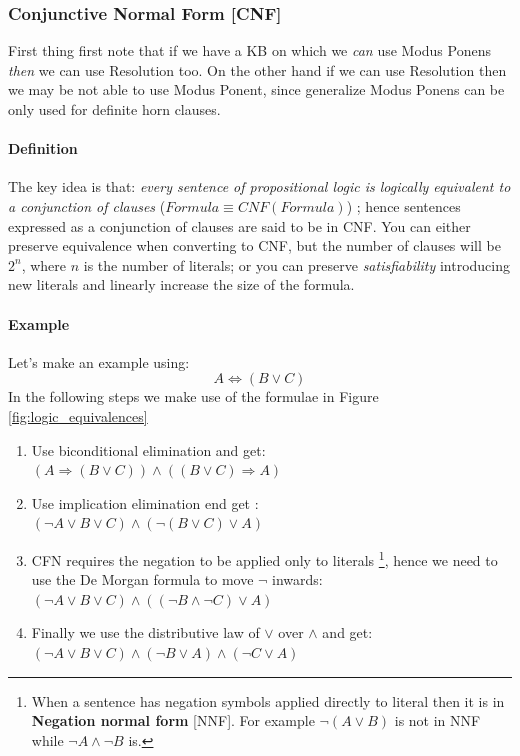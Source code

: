 \documentclass[10pt,a4paper]{article}
\begin{document}
\subsubsection{Conjunctive Normal Form [CNF]}
\label{subsec:cnf}

First thing first note that if we have a KB on which we \textit{can} use Modus Ponens \textit{then} we can use Resolution too. On the other hand if we can use Resolution then we may be not able to use Modus Ponent, since generalize Modus Ponens can be only used for definite horn clauses.



\paragraph{Definition}
The key idea is that: \textit{every sentence of propositional logic is logically equivalent to a conjunction of clauses} ($Formula\equiv CNF(Formula)$) ; hence sentences expressed as a conjunction of clauses are said to be in CNF. You can either preserve equivalence when converting to CNF, but the number of clauses will be $2^n$, where $n$ is the number of literals; or you can preserve \textit{satisfiability} introducing new literals and linearly increase the size of the formula.\\



\paragraph{Example}
Let's make an example using:
\[A \Leftrightarrow (B \vee C)\]
In the following steps we make use of the formulae in Figure \ref{fig:logic_equivalences}

\begin{enumerate}
\item Use biconditional elimination and get: \\$(A \Rightarrow (B \vee C))\wedge((B \vee C)\Rightarrow A)$
\item Use implication elimination end get :\\$(\neg A \vee B \vee C)\wedge(\neg(B\vee C)\vee A)$
\item CFN requires the negation to be applied only to literals \footnote{When a sentence has negation symbols applied directly to literal then it is in \textbf{Negation normal form} [NNF]. For example $\neg(A\vee B)$ is not in NNF while $\neg A \wedge \neg B$ is.}, hence we need to use the De Morgan formula to move $\neg$ inwards: \\$(\neg A \vee B \vee C)\wedge((\neg B\wedge \neg C)\vee A)$
\item Finally we use the distributive law of $\vee$ over $\wedge$ and get:\\
$(\neg A \vee B \vee C)\wedge(\neg B \vee A)\wedge(\neg C \vee A)$
\end{enumerate}
\end{document}
